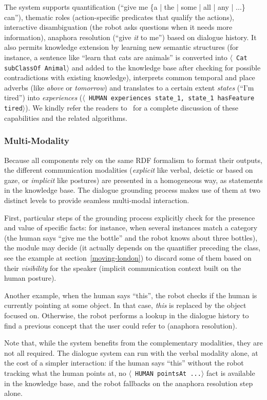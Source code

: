 \documentclass[preprint,3p,times]{elsarticle}
\newcommand{\stmt}[1]{{\footnotesize \tt $\langle$ #1\relax$\rangle$}}
\begin{document}
The system supports quantification (``give me \{a | the | some | all | any |
...\} can''), thematic roles (action-specific predicates that qualify the
actions), interactive disambiguation (the robot asks questions when it needs
more information), anaphora resolution (``give \emph{it} to me'') based on
dialogue history. It also permits knowledge extension by learning new semantic
structures (for instance, a sentence like ``learn that cats are animals'' is
converted into \stmt{Cat subClassOf Animal} and added to the knowledge base
after checking for possible contradictions with existing knowledge),
interprets common temporal and place adverbs (like \emph{above} or
\emph{tomorrow}) and translates to a certain extent \emph{states} (``I'm
tired'') into \emph{experiences} (\stmt{HUMAN experiences state\_1, state\_1
hasFeature tired}). We kindly refer the readers to~\cite{Lemaignan2011a} for a
complete discussion of these capabilities and the related algorithms.

\subsubsection{Multi-Modality}

Because all components rely on the same RDF formalism to format their outputs,
the different communication modalities (\emph{explicit} like verbal, deictic or
based on gaze, or \emph{implicit} like postures) are presented in a homogeneous
way, as statements in the knowledge base. The dialogue grounding process makes
use of them at two distinct levels to provide seamless multi-modal interaction.

First, particular steps of the grounding process explicitly check for the
presence and value of specific facts: for instance, when several instances match
a category (the human says ``give me the bottle'' and the robot knows about
three bottles), the module may decide (it actually depends on the quantifier
preceding the class, see the example at section~\ref{moving-london}) to discard
some of them based on their \emph{visibility} for the speaker (implicit
communication context built on the human posture).

Another example, when the human says ``this'', the robot checks if the human is
currently pointing at some object. In that case, \emph{this} is replaced by the
object focused on. Otherwise, the robot performs a lookup in the dialogue history
to find a previous concept that the user could refer to (anaphora resolution).

Note that, while the system benefits from the complementary modalities, they are
not all required. The dialogue system can run with the verbal modality alone, at
the cost of a simpler interaction: if the human says ``this'' without the robot
tracking what the human points at, no \stmt{HUMAN pointsAt ...} fact is
available in the knowledge base, and the robot fallbacks on the anaphora
resolution step alone.
\end{document}
